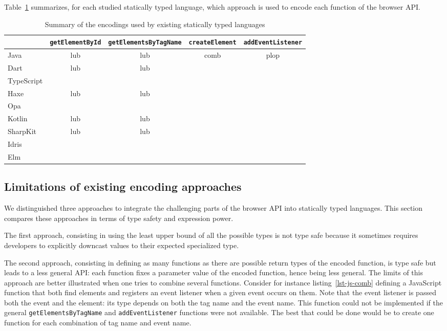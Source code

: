 \documentclass{llncs}
\newcommand{\jscode}[1]{\lstinline[language=JavaScript]|#1|}
\begin{document}
Table~\ref{table-existing-encodings} summarizes, for each studied statically typed language, which approach is used to encode each function of the browser API.

\begin{table}
\centering
\begin{tabular}{|l|c|c|c|c|}
\hline  & \jscode{getElementById} & \jscode{getElementsByTagName} & \jscode{createElement} & \jscode{addEventListener} \\
\hline Java & lub & lub & comb & plop \\
\hline Dart & lub & lub \\
\hline TypeScript \\
\hline Haxe & lub & lub \\
\hline Opa \\
\hline Kotlin & lub & lub \\
\hline SharpKit & lub & lub \\
\hline Idris \\
\hline Elm \\
\hline
\end{tabular}
\label{table-existing-encodings}
\caption{Summary of the encodings used by existing statically typed languages}
\end{table}

\subsection{Limitations of existing encoding approaches}

We distinguished three approaches to integrate the challenging parts of the browser API into statically typed languages. This section compares these approaches in terms of type safety and expression power.

The first approach, consisting in using the least upper bound of all the possible types is not type safe because it sometimes requires developers to explicitly downcast values to their expected specialized type.

The second approach, consisting in defining as many functions as there are possible return types of the encoded function, is type safe but leads to a less general API: each function fixes a parameter value of the encoded function, hence being less general. The limits of this approach are better illustrated when one tries to combine several functions. Consider for instance listing~\ref{lst-js-comb} defining a JavaScript function that both find elements and registers an event listener when a given event occurs on them. Note that the event listener is passed both the event and the element: its type depends on both the tag name and the event name. This function could not be implemented if the general \jscode{getElementsByTagName} and \jscode{addEventListener} functions were not available. The best that could be done would be to create one function for each combination of tag name and event name.
\end{document}
